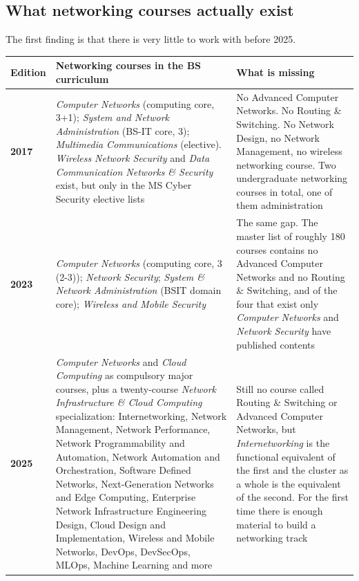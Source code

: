 \documentclass[11pt,a4paper,oneside]{report}
\begin{document}
\subsection{What networking courses actually exist}

The first finding is that there is very little to work with before 2025.

\begin{longtable}{@{}L{2.2cm}L{6.5cm}L{6.6cm}@{}}
\toprule
{}
\textbf{Edition} & \textbf{Networking courses in the BS curriculum} & \textbf{What is missing} \\
\midrule
\endhead
\textbf{\color{ed2017}2017} &
\emph{Computer Networks} (computing core, 3+1); \emph{System and Network
Administration} (BS-IT core, 3); \emph{Multimedia Communications} (elective).
\emph{Wireless Network Security} and \emph{Data Communication Networks \&
Security} exist, but only in the MS Cyber Security elective lists &
No Advanced Computer Networks. No Routing \& Switching. No Network Design, no
Network Management, no wireless networking course. Two undergraduate networking
courses in total, one of them administration \\
\textbf{\color{ed2023}2023} &
\emph{Computer Networks} (computing core, 3 (2-3)); \emph{Network Security};
\emph{System \& Network Administration} (BSIT domain core); \emph{Wireless and
Mobile Security} &
The same gap. The master list of roughly 180 courses contains no Advanced
Computer Networks and no Routing \& Switching, and of the four that exist only
\emph{Computer Networks} and \emph{Network Security} have published contents \\
\textbf{\color{ed2025}2025} &
\emph{Computer Networks} and \emph{Cloud Computing} as compulsory major courses,
plus a twenty-course \emph{Network Infrastructure \& Cloud Computing}
specialization: Internetworking, Network Management, Network Performance, Network
Programmability and Automation, Network Automation and Orchestration, Software
Defined Networks, Next-Generation Networks and Edge Computing, Enterprise Network
Infrastructure Engineering Design, Cloud Design and Implementation, Wireless and
Mobile Networks, DevOps, DevSecOps, MLOps, Machine Learning and more &
Still no course called Routing \& Switching or Advanced Computer Networks, but
\emph{Internetworking} is the functional equivalent of the first and the cluster
as a whole is the equivalent of the second. For the first time there is enough
material to build a networking track \\
\bottomrule
\end{longtable}
\end{document}
